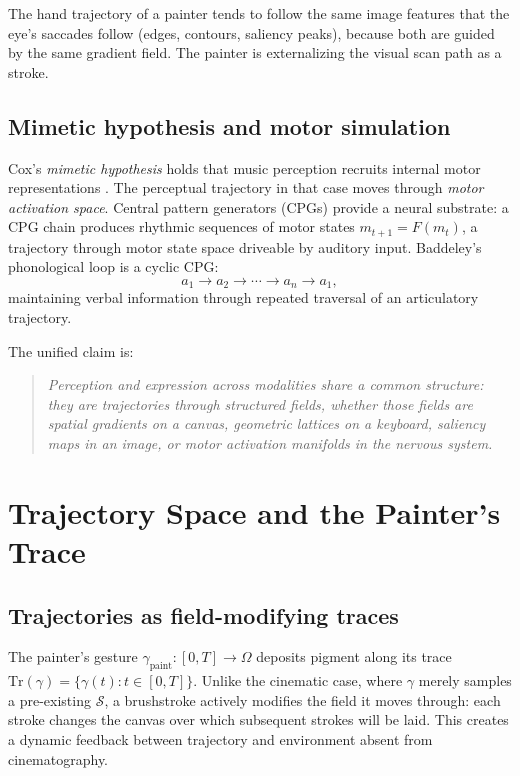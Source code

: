 \documentclass[12pt,a4paper]{article}
\theoremstyle{plain}
\theoremstyle{definition}
\begin{document}
The hand trajectory of a painter tends to follow the same image features that
the eye's saccades follow (edges, contours, saliency peaks), because both are
guided by the same gradient field. The painter is externalizing the visual
scan path as a stroke.

\subsection{Mimetic hypothesis and motor simulation}

Cox's \emph{mimetic hypothesis} holds that music perception recruits internal
motor representations \cite{cox2016}. The perceptual trajectory in that case
moves through \emph{motor activation space}. Central pattern generators (CPGs)
provide a neural substrate: a CPG chain produces rhythmic sequences of motor
states $m_{t+1}=F(m_t)$, a trajectory through motor state space driveable by
auditory input. Baddeley's phonological loop \cite{baddeley2007} is a cyclic CPG:
\[
a_1\to a_2\to\cdots\to a_n\to a_1,
\]
maintaining verbal information through repeated traversal of an articulatory
trajectory.

The unified claim is:
\begin{quote}
\emph{Perception and expression across modalities share a common structure:
they are trajectories through structured fields, whether those fields are
spatial gradients on a canvas, geometric lattices on a keyboard, saliency maps
in an image, or motor activation manifolds in the nervous system.}
\end{quote}

\section{Trajectory Space and the Painter's Trace}
\label{sec:trajectory-painter}

\subsection{Trajectories as field-modifying traces}

The painter's gesture
$\gamma_{\text{paint}}:[0,T]\to\Omega$
deposits pigment along its trace $\mathrm{Tr}(\gamma) = \{\gamma(t):t\in[0,T]\}$.
Unlike the cinematic case, where $\gamma$ merely samples a pre-existing
$\mathcal{S}$, a brushstroke actively modifies the field it moves through:
each stroke changes the canvas over which subsequent strokes will be laid.
This creates a dynamic feedback between trajectory and environment absent
from cinematography.
\end{document}

